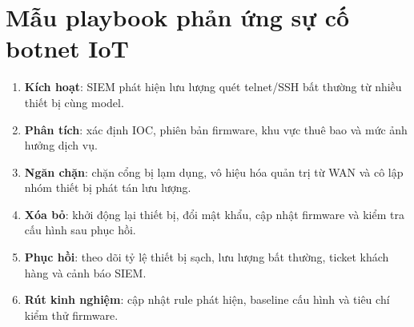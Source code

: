 \documentclass[../DoAn.tex]{subfiles}
\begin{document}
\section{Mẫu playbook phản ứng sự cố botnet IoT}
\begin{enumerate}
    \item \textbf{Kích hoạt}: SIEM phát hiện lưu lượng quét telnet/SSH bất thường từ nhiều thiết bị cùng model.
    \item \textbf{Phân tích}: xác định IOC, phiên bản firmware, khu vực thuê bao và mức ảnh hưởng dịch vụ.
    \item \textbf{Ngăn chặn}: chặn cổng bị lạm dụng, vô hiệu hóa quản trị từ WAN và cô lập nhóm thiết bị phát tán lưu lượng.
    \item \textbf{Xóa bỏ}: khởi động lại thiết bị, đổi mật khẩu, cập nhật firmware và kiểm tra cấu hình sau phục hồi.
    \item \textbf{Phục hồi}: theo dõi tỷ lệ thiết bị sạch, lưu lượng bất thường, ticket khách hàng và cảnh báo SIEM.
    \item \textbf{Rút kinh nghiệm}: cập nhật rule phát hiện, baseline cấu hình và tiêu chí kiểm thử firmware.
\end{enumerate}
\end{document}

